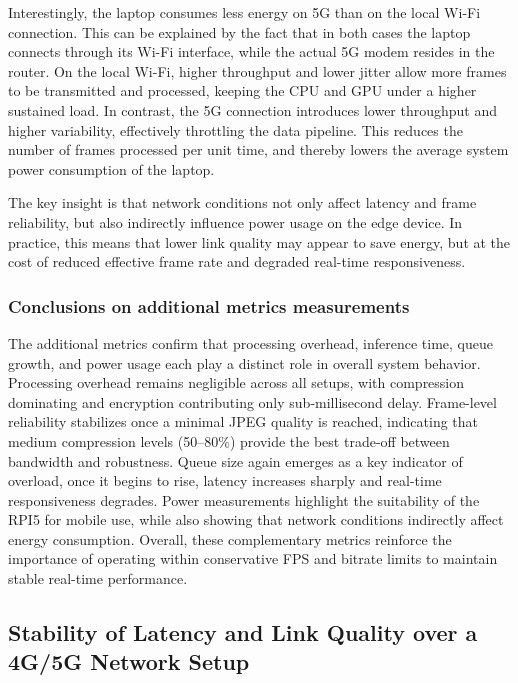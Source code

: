 \documentclass{ieeeaccess}
\begin{document}
Interestingly, the laptop consumes less energy on 5G than on the local Wi-Fi connection. This can be explained by the fact that in both cases the laptop connects through its Wi-Fi interface, while the actual 5G modem resides in the router. On the local Wi-Fi, higher throughput and lower jitter allow more frames to be transmitted and processed, keeping the CPU and GPU under a higher sustained load. In contrast, the 5G connection introduces lower throughput and higher variability, effectively throttling the data pipeline. This reduces the number of frames processed per unit time, and thereby lowers the average system power consumption of the laptop.  

The key insight is that network conditions not only affect latency and frame reliability, but also indirectly influence power usage on the edge device. In practice, this means that lower link quality may appear to save energy, but at the cost of reduced effective frame rate and degraded real-time responsiveness.  



\subsubsection{Conclusions on additional metrics measurements}
The additional metrics confirm that processing overhead, inference time, queue growth, and power usage each play a distinct role in overall system behavior. Processing overhead remains negligible across all setups, with compression dominating and encryption contributing only sub-millisecond delay. Frame-level reliability stabilizes once a minimal JPEG quality is reached, indicating that medium compression levels (50--80\%) provide the best trade-off between bandwidth and robustness. Queue size again emerges as a key indicator of overload, once it begins to rise, latency increases sharply and real-time responsiveness degrades. Power measurements highlight the suitability of the RPI5 for mobile use, while also showing that network conditions indirectly affect energy consumption. Overall, these complementary metrics reinforce the importance of operating within conservative FPS and bitrate limits to maintain stable real-time performance.

\subsection{Stability of Latency and Link Quality over a 4G/5G Network Setup}
\label{sec:stability}
\end{document}
